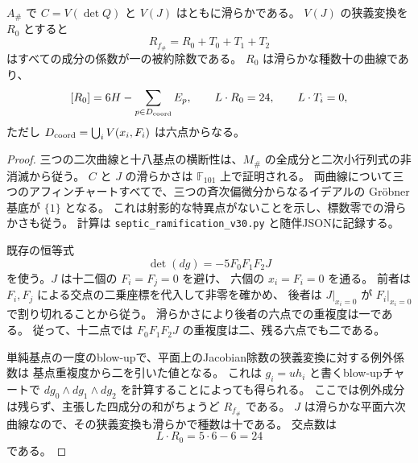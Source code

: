 \begin{lemma}[分岐源の被約な特殊ファイバー]
\label{lem:septic-special-ramification-v30}
$A_\#$ で $C=V(\det Q)$ と $V(J)$ はともに滑らかである。
$V(J)$ の狭義変換を $R_0$ とすると
\[
 R_{f_\#}=R_0+T_0+T_1+T_2
\]
はすべての成分の係数が一の被約除数である。
$R_0$ は滑らかな種数十の曲線であり、
\[
 [R_0]=6H-\sum_{p\in D_{\rm coord}}E_p,\qquad
 L\cdot R_0=24,\qquad L\cdot T_i=0,
\]
ただし $D_{\rm coord}=\bigcup_iV(x_i,F_i)$ は六点からなる。
\end{lemma}
\begin{proof}
三つの二次曲線と十八基点の横断性は、$M_\#$ の全成分と二次小行列式の非消滅から従う。
$C$ と $J$ の滑らかさは $\mathbb F_{101}$ 上で証明される。
両曲線について三つのアフィンチャートすべてで、三つの斉次偏微分からなるイデアルの
Gr\"obner基底が $\{1\}$ となる。
これは射影的な特異点がないことを示し、標数零での滑らかさも従う。
計算は \nolinkurl{septic_ramification_v30.py} と随伴JSONに記録する。

既存の恒等式
\[
 \det(dg)=-5F_0F_1F_2J
\]
を使う。$J$ は十二個の $F_i=F_j=0$ を避け、
六個の $x_i=F_i=0$ を通る。
前者は $F_i,F_j$ による交点の二乗座標を代入して非零を確かめ、
後者は $J|_{x_i=0}$ が $F_i|_{x_i=0}$ で割り切れることから従う。
滑らかさにより後者の六点での重複度は一である。
従って、十二点では $F_0F_1F_2J$ の重複度は二、残る六点でも二である。

単純基点の一度のblow-upで、平面上のJacobian除数の狭義変換に対する例外係数は
基点重複度から二を引いた値となる。
これは $g_i=uh_i$ と書くblow-upチャートで
$dg_0\wedge dg_1\wedge dg_2$ を計算することによっても得られる。
ここでは例外成分は残らず、主張した四成分の和がちょうど $R_{f_\#}$ である。
$J$ は滑らかな平面六次曲線なので、その狭義変換も滑らかで種数は十である。
交点数は
\[
 L\cdot R_0=5\cdot6-6=24
\]
である。
\end{proof}

